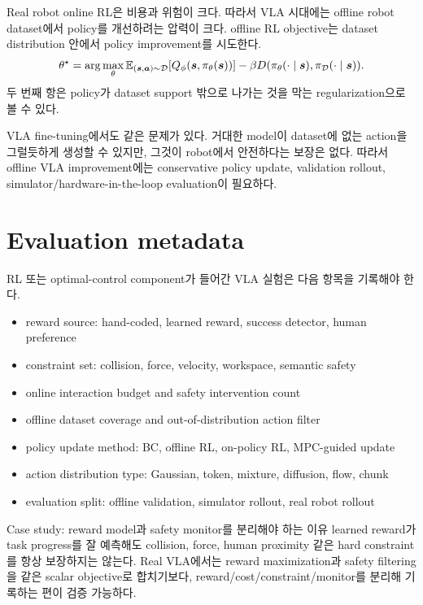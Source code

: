 Real robot online RL은 비용과 위험이 크다. 따라서 VLA 시대에는 offline robot dataset에서 policy를 개선하려는 압력이 크다. offline RL objective는 dataset distribution 안에서 policy improvement를 시도한다.
\begin{equation}
  \theta^\star
  =
  \arg\max_{\theta}
  \mathbb{E}_{(\bm{s},\bm{a})\sim\mathcal{D}}
  [Q_{\phi}(\bm{s},\pi_{\theta}(\bm{s}))]
  -
  \beta D(\pi_{\theta}(\cdot\mid\bm{s}),\pi_{\mathcal{D}}(\cdot\mid\bm{s})).
  \label{eq:offline-rl-regularized}
\end{equation}
두 번째 항은 policy가 dataset support 밖으로 나가는 것을 막는 regularization으로 볼 수 있다.

VLA fine-tuning에서도 같은 문제가 있다. 거대한 model이 dataset에 없는 action을 그럴듯하게 생성할 수 있지만, 그것이 robot에서 안전하다는 보장은 없다. 따라서 offline VLA improvement에는 conservative policy update, validation rollout, simulator/hardware-in-the-loop evaluation이 필요하다.

\section{Evaluation metadata}

RL 또는 optimal-control component가 들어간 VLA 실험은 다음 항목을 기록해야 한다.

\begin{itemize}
  \item reward source: hand-coded, learned reward, success detector, human preference
  \item constraint set: collision, force, velocity, workspace, semantic safety
  \item online interaction budget and safety intervention count
  \item offline dataset coverage and out-of-distribution action filter
  \item policy update method: BC, offline RL, on-policy RL, MPC-guided update
  \item action distribution type: Gaussian, token, mixture, diffusion, flow, chunk
  \item evaluation split: offline validation, simulator rollout, real robot rollout
\end{itemize}

\begin{casebox}{Case study: reward model과 safety monitor를 분리해야 하는 이유}
learned reward가 task progress를 잘 예측해도 collision, force, human proximity 같은 hard constraint를 항상 보장하지는 않는다. Real VLA에서는 reward maximization과 safety filtering을 같은 scalar objective로 합치기보다, reward/cost/constraint/monitor를 분리해 기록하는 편이 검증 가능하다.
\end{casebox}

